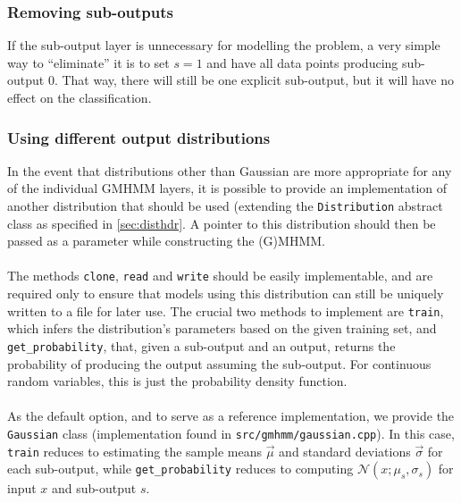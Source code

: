 \documentclass[12pt,openany]{article}
\begin{document}
	\subsubsection{Removing sub-outputs}
	If the sub-output layer is unnecessary for modelling the problem, a very simple way to ``eliminate'' it is to set $s = 1$ and have all data points producing sub-output $0$. That way, there will still be one explicit sub-output, but it will have no effect on the classification.
	\subsubsection{Using different output distributions}\label{sec:difdist}
	In the event that distributions other than Gaussian are more appropriate for any of the individual GMHMM layers, it is possible to provide an implementation of another distribution that should be used (extending the {\tt Distribution} abstract class as specified in \cref{sec:disthdr}. A pointer to this distribution should then be passed as a parameter while constructing the (G)MHMM.\\ \\
	The methods {\tt clone}, {\tt read} and {\tt write} should be easily implementable, and are required only to ensure that models using this distribution can still be uniquely written to a file for later use. The crucial two methods to implement are {\tt train}, which infers the distribution's parameters based on the given training set, and {\tt get\_probability}, that, given a sub-output and an output, returns the probability of producing the output assuming the sub-output. For continuous random variables, this is just the probability density function.\\ \\
	As the default option, and to serve as a reference implementation, we provide the {\tt Gaussian} class (implementation found in {\tt src/gmhmm/gaussian.cpp}). In this case, {\tt train} reduces to estimating the sample means $\vec{\mu}$ and standard deviations $\vec{\sigma}$ for each sub-output, while {\tt get\_probability} reduces to computing $\mathcal{N}(x; \mu_s, \sigma_s)$ for input $x$ and sub-output $s$.
\end{document}
